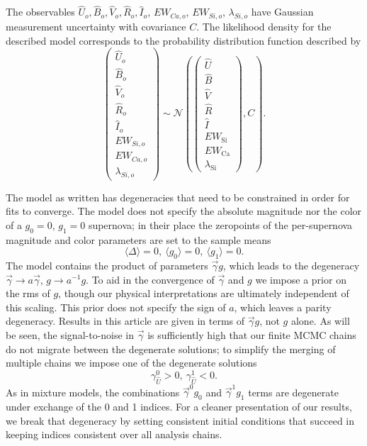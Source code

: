 \documentclass[trackchanges]{aastex62}   	%
\begin{document}
The observables
$\hat{U}_o, {\hat{B}}_o, {\hat{V}}_o, {\hat{R}}_o, {\hat{I}}_o$, $EW_{Ca,o}$, $EW_{Si,o}$, $\lambda_{Si,o}$
have Gaussian measurement uncertainty with covariance $C$.
The
likelihood density for the described model
corresponds to the probability distribution function described by
\begin{equation}
\begin{pmatrix}
{\hat{U}}_o\\{\hat{B}}_o\\ {\hat{V}}_o\\{\hat{R}}_o\\{\hat{I}}_o\\EW_{Si, o}\\ EW_{Ca, o} \\ \lambda_{Si, o}
\end{pmatrix}
\sim \mathcal{N}
\left(
\begin{pmatrix}
{\hat{U}}  \\{\hat{B}}  \\
{\hat{V}}\\{\hat{R}}\\{\hat{I}}\\
EW_{\mathrm{Si}}\\ EW_{\mathrm{Ca}} \\ \lambda_{\mathrm{Si}}
\end{pmatrix}
,C
\right).
\label{dust:eqn}
\end{equation}


The model as written has degeneracies that need to be constrained in order for fits to converge.
The model does not specify the absolute magnitude nor the 
color of a $g_0=0$, $g_1=0$ supernova;
in their place the zeropoints of the per-supernova magnitude and color parameters are set to the sample means
\begin{equation}
\langle \Delta \rangle=0,\ \langle g_0 \rangle=0,\ \langle g_1 \rangle=0.
\label{zero:eqn}
\end{equation}
The model contains the product of parameters
$\vec{\gamma} g$, which leads to the degeneracy $\vec{\gamma} \rightarrow a\vec{\gamma}$, $g \rightarrow a^{-1} g$.
To aid in the convergence of $\vec{\gamma}$ and $g$ we impose a prior on the rms of $g$, though
our physical interpretations are ultimately independent of this scaling.
This prior does not specify the sign of $a$, which leaves a parity degeneracy. 
Results in this article are given in terms of $\vec{\gamma}g$, not $g$ alone.
As will be seen, the signal-to-noise in $\vec{\gamma}$ is sufficiently
high that our finite MCMC chains do not migrate between the degenerate solutions; to simplify the merging of multiple chains
we impose one of the degenerate solutions
\begin{equation}
\gamma^0_{\hat{U}} > 0,\ \gamma^1_{\hat{U}} < 0.
\end{equation}
As  in mixture models, the combinations $\vec{\gamma}^0 g_0$ and $\vec{\gamma}^1 g_1$ terms are degenerate under exchange of the 0 and 1 indices. For a cleaner presentation of our results, 
we break that degeneracy  by setting consistent initial conditions that succeed in keeping indices consistent over all analysis chains.  
\end{document}
